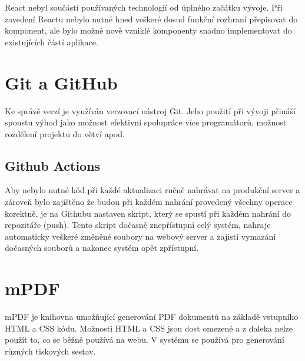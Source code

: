 React nebyl součástí používaných technologií od úplného začátku vývoje. Při zavedení Reactu nebylo nutné hned veškeré dosud funkční rozhraní přepisovat do komponent, ale bylo možné nově vzniklé komponenty snadno implementovat do existujících částí aplikace.

\section{Git a GitHub}

Ke správě verzí je využíván verzovací nástroj Git. Jeho použití při vývoji přináší spoustu výhod jako možnost efektivní spolupráce více programátorů, možnost rozdělení projektu do větví apod.

\subsection{Github Actions}

Aby nebylo nutné kód při každé aktualizaci ručně nahrávat na produkční server a zároveň bylo zajištěno že budou při každém nahrání provedený všechny operace korektně, je na Githubu nastaven skript, který se spustí při každém nahrání do repozitáře (push). Tento skript dočasně znepřístupní celý systém, nahraje automaticky veškeré změněné soubory na webový server a zajistí vymazání dočasných souborů a nakonec systém opět zpřístupní.


\section{mPDF}

mPDF je knihovna umožňující generování PDF dokumentů na základě vstupního HTML a CSS kódu. Možnosti HTML a CSS jsou dost omezené a z daleka nelze použít to, co se běžně používá na webu. V systému se používá pro generování různých tiskových sestav.





